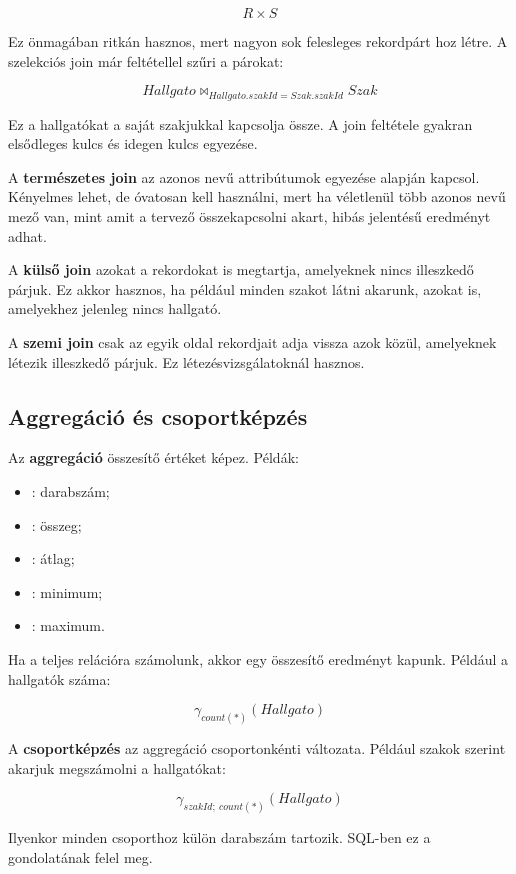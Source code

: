 \[
  R \times S
\]

Ez önmagában ritkán hasznos, mert nagyon sok felesleges rekordpárt hoz létre. A szelekciós join már feltétellel szűri a párokat:

\[
  Hallgato \bowtie_{Hallgato.szakId = Szak.szakId} Szak
\]

Ez a hallgatókat a saját szakjukkal kapcsolja össze. A join feltétele gyakran elsődleges kulcs és idegen kulcs egyezése.

A \textbf{természetes join} az azonos nevű attribútumok egyezése alapján kapcsol. Kényelmes lehet, de óvatosan kell használni, mert ha véletlenül több azonos nevű mező van, mint amit a tervező összekapcsolni akart, hibás jelentésű eredményt adhat.

A \textbf{külső join} azokat a rekordokat is megtartja, amelyeknek nincs illeszkedő párjuk. Ez akkor hasznos, ha például minden szakot látni akarunk, azokat is, amelyekhez jelenleg nincs hallgató.

A \textbf{szemi join} csak az egyik oldal rekordjait adja vissza azok közül, amelyeknek létezik illeszkedő párjuk. Ez létezésvizsgálatoknál hasznos.

\subsection{Aggregáció és csoportképzés}

Az \textbf{aggregáció} összesítő értéket képez. Példák:

\begin{itemize}
  \item {}: darabszám;
  \item {}: összeg;
  \item {}: átlag;
  \item {}: minimum;
  \item {}: maximum.
\end{itemize}

Ha a teljes relációra számolunk, akkor egy összesítő eredményt kapunk. Például a hallgatók száma:

\[
  \gamma_{count(*)}(Hallgato)
\]

A \textbf{csoportképzés} az aggregáció csoportonkénti változata. Például szakok szerint akarjuk megszámolni a hallgatókat:

\[
  \gamma_{szakId;\ count(*)}(Hallgato)
\]

Ilyenkor minden  csoporthoz külön darabszám tartozik. SQL-ben ez a  gondolatának felel meg.

